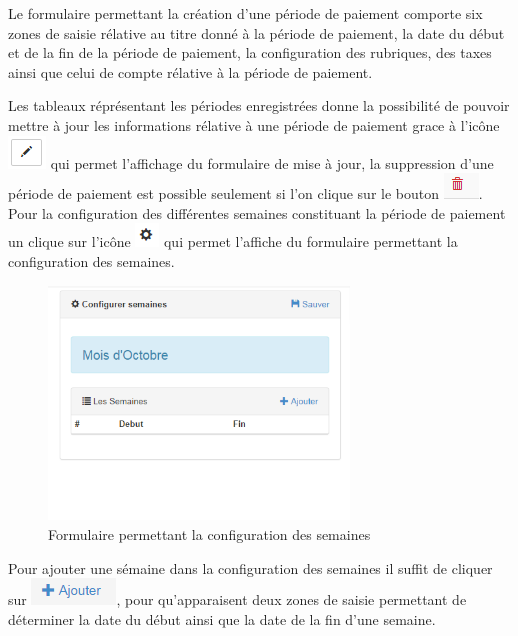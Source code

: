 \documentclass[12pt,a4paper]{report}
\begin{document}
Le formulaire permettant la création d'une période de paiement comporte six zones de saisie rélative au titre donné à la période de paiement, la date du début et de la fin de la période de paiement, la configuration des rubriques, des taxes ainsi que celui de compte rélative à la période de paiement.

Les tableaux réprésentant les périodes enregistrées donne la possibilité de pouvoir mettre à jour les informations rélative à une période de paiement grace à l'icône \includegraphics[scale=0.7]{pic/EditBlack.png} qui permet l'affichage du formulaire de mise à jour, la suppression d'une période de paiement est possible seulement si l'on clique sur le bouton \includegraphics[scale=0.7]{pic/DeleteWRed.png}.
Pour la configuration des différentes semaines constituant la période de paiement un clique sur l'icône \includegraphics[scale=0.7]{pic/config.png} qui permet l'affiche du formulaire permettant la configuration des semaines.

\begin{figure}[h]
\begin{center}
\includegraphics[width=8cm]{pic/ConfigWeek.png}
\end{center}
\caption{Formulaire permettant la configuration des semaines}
\label{Formulaire permettant la configuration des semaines}
\end{figure} 

Pour ajouter une sémaine dans la configuration des semaines il suffit de cliquer sur \includegraphics[scale=0.7]{pic/Ajouter.png}, pour qu'apparaisent deux zones de saisie permettant de déterminer la date du début ainsi que la date de la fin d'une semaine.
\end{document}
